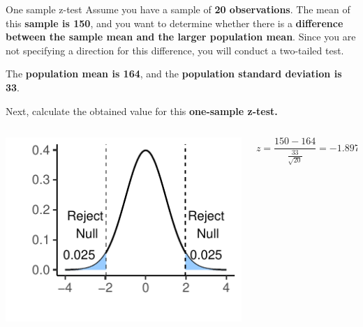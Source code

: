 \documentclass[
  ignorenonframetext,
]{beamer}
\begin{document}
\begin{frame}{One sample z-test}
\label{one-sample-z-test-1}
Assume you have a sample of \textbf{20 observations}. The mean of this
\textbf{sample is 150}, and you want to determine whether there is a
\textbf{difference between the sample mean and the larger population
mean}. Since you are not specifying a direction for this difference, you
will conduct a two-tailed test.

The \textbf{population mean is 164}, and the \textbf{population standard
deviation is 33}.

Next, calculate the obtained value for this \textbf{one-sample z-test.}

\begin{columns}[T]
\begin{column}{0.5\textwidth}
\includegraphics{Inferential-Stat-and-Z-test_files/figure-beamer/unnamed-chunk-6-1.pdf}
\end{column}

\begin{column}{0.5\textwidth}
\vspace{1cm}

\[
z = \frac{150 - 164}{\frac{33}{\sqrt{20}}} = -1.897
\]
\end{column}
\end{columns}
\end{frame}
\end{document}
